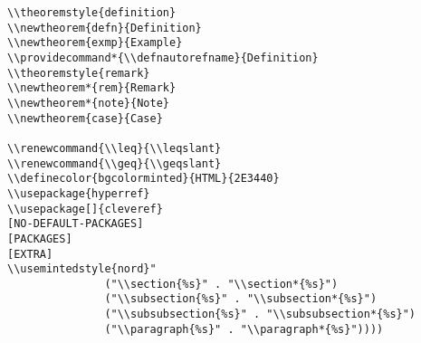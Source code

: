 \documentclass[c]{article}
\theoremstyle{plain}%
\theoremstyle{definition}
\providecommand*{\defnautorefname}{Definition}
\theoremstyle{remark}
\renewcommand{\leq}{\leqslant}
\renewcommand{\geq}{\geqslant}
\begin{document}
\begin{verbatim}
\\theoremstyle{definition}
\\newtheorem{defn}{Definition}
\\newtheorem{exmp}{Example}
\\providecommand*{\\defnautorefname}{Definition}
\\theoremstyle{remark}
\\newtheorem*{rem}{Remark}
\\newtheorem*{note}{Note}
\\newtheorem{case}{Case}

\\renewcommand{\\leq}{\\leqslant}
\\renewcommand{\\geq}{\\geqslant}
\\definecolor{bgcolorminted}{HTML}{2E3440}
\\usepackage{hyperref}
\\usepackage[]{cleveref}
[NO-DEFAULT-PACKAGES]
[PACKAGES]
[EXTRA]
\\usemintedstyle{nord}"
               ("\\section{%s}" . "\\section*{%s}")
               ("\\subsection{%s}" . "\\subsection*{%s}")
               ("\\subsubsection{%s}" . "\\subsubsection*{%s}")
               ("\\paragraph{%s}" . "\\paragraph*{%s}"))))
\end{verbatim}
\end{document}
